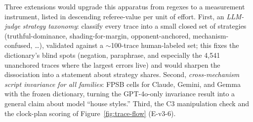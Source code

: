 Three extensions would upgrade this apparatus from regexes to a measurement instrument, listed in descending referee-value per unit of effort. First, an \emph{LLM-judge strategy taxonomy}: classify every trace into a small closed set of strategies (truthful-dominance, shading-for-margin, opponent-anchored, mechanism-confused, \ldots), validated against a $\sim$100-trace human-labeled set; this fixes the dictionary's blind spots (negation, paraphrase, and especially the 4{,}541 unanchored traces where the largest errors live) and would sharpen the dissociation into a statement about strategy shares.  Second, \emph{cross-mechanism script invariance for all families}: FPSB cells for Claude, Gemini, and Gemma with the frozen dictionary, turning the GPT-4o-only invariance result into a general claim about model ``house styles.'' Third, the C3 manipulation check and the clock-plan scoring of Figure~\ref{fig:trace-flow} (E-v3-6). 
